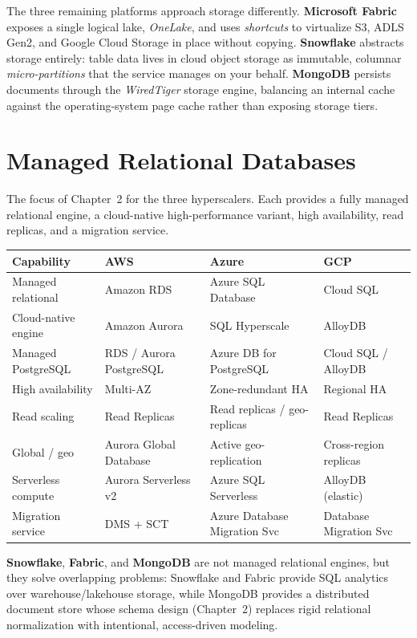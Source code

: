 \noindent The three remaining platforms approach storage differently.
\textbf{Microsoft Fabric} exposes a single logical lake, \emph{OneLake}, and uses
\emph{shortcuts} to virtualize S3, ADLS Gen2, and Google Cloud Storage in place without copying.
\textbf{Snowflake} abstracts storage entirely: table data lives in cloud object storage as
immutable, columnar \emph{micro-partitions} that the service manages on your behalf.
\textbf{MongoDB} persists documents through the \emph{WiredTiger} storage engine, balancing an
internal cache against the operating-system page cache rather than exposing storage tiers.

\section{Managed Relational Databases}
%
The focus of Chapter~2 for the three hyperscalers. Each provides a fully managed relational
engine, a cloud-native high-performance variant, high availability, read replicas, and a
migration service.

\begin{center}
\footnotesize
\begin{tabular}{@{}p{2.8cm}p{3.2cm}p{3.2cm}p{3.2cm}@{}}
\toprule
\textbf{Capability} & \textbf{AWS} & \textbf{Azure} & \textbf{GCP} \\
\midrule
Managed relational & Amazon RDS & Azure SQL Database & Cloud SQL \\
Cloud-native engine & Amazon Aurora & SQL Hyperscale & AlloyDB \\
Managed PostgreSQL & RDS / Aurora PostgreSQL & Azure DB for PostgreSQL & Cloud SQL / AlloyDB \\
High availability & Multi-AZ & Zone-redundant HA & Regional HA \\
Read scaling & Read Replicas & Read replicas / geo-replicas & Read Replicas \\
Global / geo & Aurora Global Database & Active geo-replication & Cross-region replicas \\
Serverless compute & Aurora Serverless v2 & Azure SQL Serverless & AlloyDB (elastic) \\
Migration service & DMS + SCT & Azure Database Migration Svc & Database Migration Svc \\
\bottomrule
\end{tabular}
\end{center}

\noindent \textbf{Snowflake}, \textbf{Fabric}, and \textbf{MongoDB} are not managed relational
engines, but they solve overlapping problems: Snowflake and Fabric provide SQL analytics over
warehouse/lakehouse storage, while MongoDB provides a distributed document store whose schema
design (Chapter~2) replaces rigid relational normalization with intentional, access-driven modeling.

